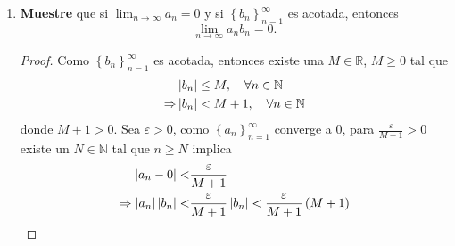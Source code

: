 \documentclass[12pt]{article}
\begin{document}
\begin{enumerate}
\begin{proof}
\begin{equation*}
                \begin{split}
                    \abs{\frac{n!}{n^n}-0}=&\frac{n!}{^n}\\
                    \leq&\frac{1}{n}\\
                    \leq&\frac{1}{N}\\
                    <\varepsilon\\
                    \Rightarrow \abs{\frac{n!}{^n}-0}<&\varepsilon\\
                \end{split}
            \end{equation*}
            Por tanto, de la definición de límite se sigue que
            \begin{equation*}
                \lim_{n\rightarrow\infty}\frac{n!}{n^n}=0
            \end{equation*}
            \qed
        \end{proof}
    \item \textbf{Muestre} que si $\lim_{n\rightarrow\infty}a_n=0$ y si $\left\{b_n\right\}_{n=1}^{\infty}$ es acotada, entonces
        \begin{equation*}
            \lim_{n\rightarrow\infty}a_nb_n=0.
        \end{equation*}
        \begin{proof}
            Como $\left\{b_n\right\}_{n=1}^{\infty}$ es acotada, entonces existe una $M\in\mathbb{R}$, $M\geq0$ tal que
            \begin{equation*}
                \begin{split}
                    &\left| b_n \right|\leq M,\quad \forall n\in\mathbb{N}\\
                    \Rightarrow&\left| b_n \right|< M+1,\quad \forall n\in\mathbb{N}\\
                \end{split}
            \end{equation*}
            donde $M+1>0$. Sea $\varepsilon>0$, como $\left\{a_n\right\}_{n=1}^{\infty}$ converge a $0$, para $\frac{\varepsilon}{M+1}>0$ existe un $N\in\mathbb{N}$ tal que $n\geq N$ implica
            \begin{equation*}
                \begin{split}
                    \abs{a_n-0}<&\frac{\varepsilon}{M+1}\\
                    \Rightarrow \abs{a_n}\abs{b_n}<&\frac{\varepsilon}{M+1}\abs{b_n}<\frac{\varepsilon}{M+1}\left(M+1\right)\\

\end{split}
\end{equation*}
\end{proof}
\end{enumerate}
\end{document}
